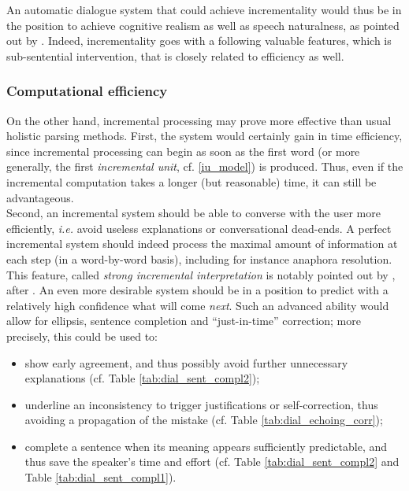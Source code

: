 \documentclass[11pt]{article}
\begin{document}
				
				
				
				
				An automatic dialogue system that could achieve incrementality would thus be in the position to achieve cognitive realism as well as speech naturalness, as pointed out by \cite{schlangen2009}. Indeed, incrementality goes with a following valuable features, which is sub-sentential intervention, that is closely related to efficiency as well.

			\subsubsection{Computational efficiency}
				On the other hand, incremental processing may prove more effective than usual holistic parsing methods. First, the system would certainly gain in time efficiency, since incremental processing can begin as soon as the first word (or more generally, the first \textit{incremental unit}, cf. \ref{iu_model}) is produced. Thus, even if the incremental computation takes a longer (but reasonable) time, it can still be advantageous.\\
				
				Second, an incremental system should be able to converse with the user more efficiently, \textit{i.e.} avoid useless explanations or conversational dead-ends. A perfect incremental system should indeed process the maximal amount of information at each step (in a word-by-word basis), including for instance anaphora resolution. This feature, called \textit{strong incremental interpretation} is notably pointed out by \cite{hough2015}, after \cite{milward1991}.  An even more desirable system should be in a position to predict with a relatively high confidence what will come \textit{next}. Such an advanced ability would allow for ellipsis, sentence completion and ``just-in-time'' correction; more precisely, this could be used to:
				\begin{itemize}
					\item show early agreement, and thus possibly avoid further unnecessary explanations (cf. Table \ref{tab:dial_sent_compl2}); \vspace{-2mm}
				 	\item underline an inconsistency to trigger justifications or self-correction, thus avoiding a propagation of the mistake (cf. Table \ref{tab:dial_echoing_corr}); \vspace{-2mm}
				 	\item complete a sentence when its meaning appears sufficiently predictable, and thus save the speaker's time and effort (cf. Table \ref{tab:dial_sent_compl2} and Table \ref{tab:dial_sent_compl1}).
				\end{itemize}
				
\end{document}
